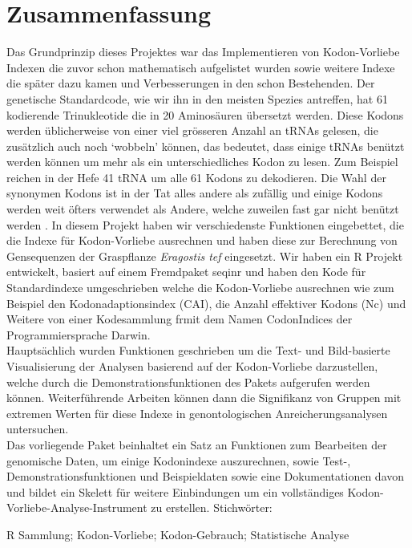 \chapter*{Zusammenfassung}
Das Grundprinzip dieses Projektes war das Implementieren von Kodon-Vorliebe Indexen die zuvor schon mathematisch aufgelistet wurden \cite{BinderCh13} sowie weitere Indexe die später dazu kamen und Verbesserungen in den schon Bestehenden. 
Der genetische Standardcode, wie wir ihn in den meisten Spezies antreffen, hat 61 kodierende Trinukleotide die in 20 Aminosäuren übersetzt werden. Diese Kodons werden üblicherweise von einer viel grösseren Anzahl an tRNAs gelesen, die zusätzlich auch noch ‘wobbeln’ können, das bedeutet, dass einige tRNAs benützt werden können um mehr als ein unterschiedliches Kodon zu lesen. Zum Beispiel reichen in der Hefe 41 tRNA um alle 61 Kodons zu dekodieren. Die Wahl der synonymen Kodons ist in der Tat alles andere als zufällig und einige Kodons werden weit öfters verwendet als Andere, welche zuweilen fast gar nicht benützt werden \cite{Cannarozzi2010}. In diesem Projekt haben wir verschiedenste Funktionen eingebettet, die die Indexe für Kodon-Vorliebe ausrechnen und haben diese zur Berechnung von Gensequenzen der Graspflanze \textit{Eragostis tef} eingesetzt. Wir haben ein R Projekt entwickelt, basiert auf einem Fremdpaket seqinr und haben den Kode für Standardindexe umgeschrieben welche die Kodon-Vorliebe ausrechnen wie zum Beispiel den Kodonadaptionsindex (CAI), die Anzahl effektiver Kodons (Nc) und Weitere von einer Kodesammlung frmit dem Namen CodonIndices der Programmiersprache Darwin.\\
Hauptsächlich wurden Funktionen geschrieben um die Text- und Bild-basierte Visualisierung der Analysen basierend auf der Kodon-Vorliebe darzustellen, welche durch die Demonstrationsfunktionen des Pakets aufgerufen werden können. Weiterführende Arbeiten können dann die Signifikanz von Gruppen mit extremen Werten für diese Indexe in genontologischen Anreicherungsanalysen untersuchen.\\
Das vorliegende Paket beinhaltet ein Satz an Funktionen zum Bearbeiten der genomische Daten, um einige Kodonindexe auszurechnen, sowie Test-, Demonstrationsfunktionen und Beispieldaten sowie eine Dokumentationen davon und bildet ein Skelett für weitere Einbindungen um ein vollständiges Kodon-Vorliebe-Analyse-Instrument zu erstellen.
\vskip0.5cm
Stichwörter: 

R Sammlung; Kodon-Vorliebe; Kodon-Gebrauch; Statistische Analyse








